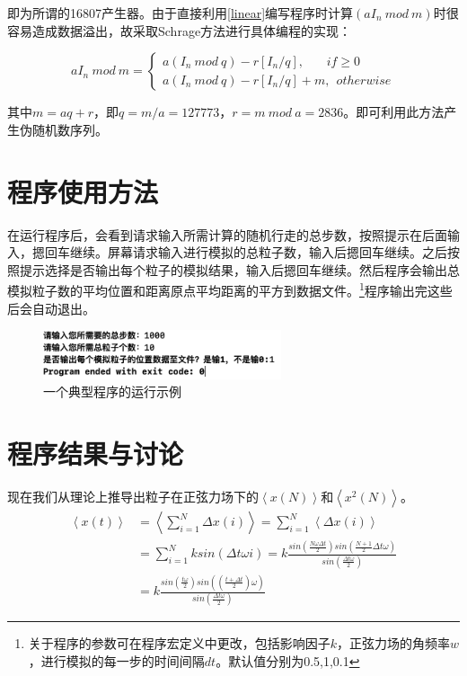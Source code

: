 \documentclass[a4paper,11pt]{article}
\begin{document}
即为所谓的16807产生器。由于直接利用\ref{linear}编写程序时计算$(aI_{n} \ mod \ m )$时很容易造成数据溢出，故采取Schrage方法进行具体编程的实现：

\begin{equation}
	aI_{n} \ mod \ m = \left\{
	\begin{array}{l}
		a(I_{n}\ mod \ q) - r[I_{n}/q],\ \ \ \ \ \ \ \ if \geq 0 \\
		a(I_{n}\ mod \ q) - r[I_{n}/q] + m,\ \ otherwise	
			\end{array}
	\right.
\end{equation}

其中$m=aq+r$，即$q=m/a=127773$，$r=m \ mod \ a=2836$。即可利用此方法产生伪随机数序列。



\section{程序使用方法}
在运行程序后，会看到请求输入所需计算的随机行走的总步数，按照提示在后面输入，摁回车继续。屏幕请求输入进行模拟的总粒子数，输入后摁回车继续。之后按照提示选择是否输出每个粒子的模拟结果，输入后摁回车继续。然后程序会输出总模拟粒子数的平均位置和距离原点平均距离的平方到数据文件。\footnote{关于程序的参数可在程序宏定义中更改，包括影响因子$k$，正弦力场的角频率$w$，进行模拟的每一步的时间间隔$dt$。默认值分别为0.5,1,0.1}程序输出完这些后会自动退出。

\begin{figure}[!htbp]        
\centering
\includegraphics[width=7cm]{example.png}      
\caption{ 一个典型程序的运行示例}      
\end{figure}


\section{程序结果与讨论}
现在我们从理论上推导出粒子在正弦力场下的$\left<x(N) \right>$和$\left<x^{2}(N) \right>$。
 \begin{equation}
 \begin{aligned}
 	\left<x(t) \right> &= \left<\sum_{i=1}^{N} \Delta x(i) \right> = \sum_{i=1}^{N} \left<\Delta x(i) \right>  \\
 	&= \sum_{i=1}^{N} ksin(\Delta t\omega i) = k\frac{sin(\frac{N\omega \Delta t}{2}) sin(\frac{N+1}{2} \Delta t\omega)}{sin(\frac{\Delta t \omega}{2} )} \\
 	&= k\frac{sin(\frac{t\omega }{2}) sin((\frac{t+\Delta t}{2})\omega)}{sin(\frac{\Delta t \omega}{2} )}
 \end{aligned}
 \end{equation}
 
\end{document}

